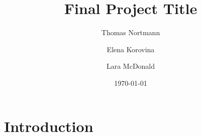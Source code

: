 \documentclass{article}
\title{Final Project Title}
\author{Thomas Nortmann  \\
	\and 
	Elena Korovina\\
	\and
	Lara McDonald
	}
\date{\today}
\begin{document}
\maketitle


\begin{abstract}

\end{abstract}

\section{Introduction}




\end{document}
